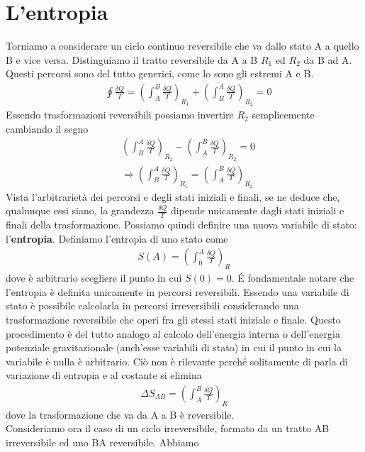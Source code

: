 \documentclass[10pt,a4paper]{article}
\begin{document}
\section{L'entropia}
Torniamo a considerare un ciclo continuo reversibile che va dallo stato A a quello B e vice versa. Distinguiamo il tratto reversibile da A a B \(R_1\) ed \(R_2\) da B ad A. Questi percorsi sono del tutto generici, come lo sono gli estremi A e B. 
\begin{align*}
	&\oint \frac{\delta Q}{T} = \left(\int_A^B  \frac{\delta Q}{T}\right)_{R_1} + \left(\int_B^A \frac{\delta Q}{T}\right)_{R_2}  = 0
\end{align*}
Essendo trasformazioni reversibili possiamo invertire \(R_2\) semplicemente cambiando il segno
\begin{align*}
	&\left(\int_B^A \frac{\delta Q}{T}\right)_{R_2} -\left(\int_A^B \frac{\delta Q}{T}\right)_{R_2} = 0  \\
	&\Rightarrow \left(\int_B^A \frac{\delta Q}{T}\right)_{R_1}   = \left(\int_A^B \frac{\delta Q}{T}\right)_{R_2} 
\end{align*}
Vista l'arbitrarietà dei percorsi e degli stati iniziali e finali, se ne deduce che, qualunque essi siano, la grandezza \(\frac{\delta Q}{T}\) dipende unicamente dagli stati iniziali e finali della trasformazione. Possiamo quindi definire una nuova variabile di stato: l'\textbf{entropia}. Definiamo l'entropia di uno stato come 
\begin{align*}
	S(A) = \left(\int_0^A \frac{\delta Q}{T}\right)_{R}
\end{align*}
dove è arbitrario scegliere il punto in cui \(S(0)=0\). \'{E} fondamentale notare che l'entropia è definita unicamente in percorsi reversibili. Essendo una variabile di stato è possibile calcolarla in percorsi irreversibili considerando una trasformazione reversibile che operi fra gli stessi stati iniziale e finale. Questo procedimento è del tutto analogo al calcolo dell'energia interna o dell'energia potenziale gravitazionale (anch'esse variabili di stato) in cui il punto in cui la variabile è nulla è arbitrario. Ciò non è rilevante perché solitamente di parla di variazione di entropia e al costante si elimina
\begin{align*}
	\Delta S_{AB} = \left(\int_A^B \frac{\delta Q}{T}\right)_R
\end{align*}
dove la trasformazione che va da A a B è reversibile.\\
Consideriamo ora il caso di un ciclo irreversibile, formato da un tratto AB irreversibile ed uno BA reversibile. Abbiamo
\end{document}
